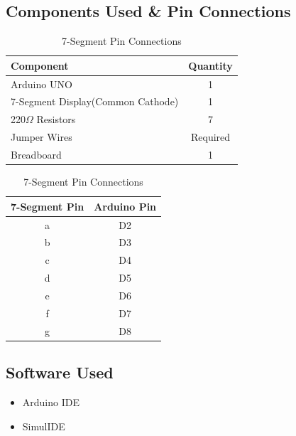 \subsection {Components Used \& Pin Connections}
\begin{table}[H]
\centering

\begin{minipage}{0.48\textwidth}
\centering
\caption{7-Segment Components}
\label{tab:7segment_components}

\begin{tabular}{|p{5cm}|c|}
\hline
\textbf{Component} & \textbf{Quantity} \\
\hline
Arduino UNO & 1 \\
7-Segment Display(Common Cathode) & 1 \\
220$\Omega$ Resistors & 7 \\
Jumper Wires & Required \\
Breadboard & 1 \\
\hline
\end{tabular}

\end{minipage}
\hfill
\begin{minipage}{0.48\textwidth}
\centering
\caption{7-Segment Pin Connections}
\label{tab:7segment_pins}

\begin{tabular}{|c|c|}
\hline
\textbf{7-Segment Pin} & \textbf{Arduino Pin} \\
\hline
a & D2 \\
b & D3 \\
c & D4 \\
d & D5 \\
e & D6 \\
f & D7 \\
g & D8 \\
\hline
\end{tabular}

\end{minipage}

\end{table}


\subsection{Software Used}

\begin{itemize}
    \item Arduino IDE
    \item SimulIDE
\end{itemize}

